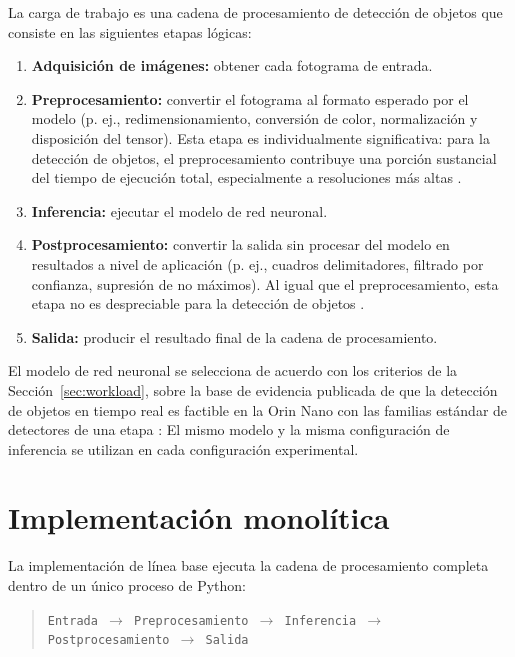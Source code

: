 La carga de trabajo es una cadena de procesamiento de detección de objetos
que consiste en las siguientes etapas lógicas:

\begin{enumerate}
  \item \textbf{Adquisición de imágenes:} obtener cada fotograma de
        entrada.
  \item \textbf{Preprocesamiento:} convertir el fotograma al formato
        esperado por el modelo (p. ej., redimensionamiento, conversión de
        color, normalización y disposición del tensor). Esta etapa es
        individualmente significativa: para la detección de objetos, el
        preprocesamiento contribuye una porción sustancial del tiempo de
        ejecución total, especialmente a resoluciones más altas
        \cite{szegedi2026}.
  \item \textbf{Inferencia:} ejecutar el modelo de red neuronal.
  \item \textbf{Postprocesamiento:} convertir la salida sin procesar del
        modelo en resultados a nivel de aplicación (p. ej., cuadros
        delimitadores, filtrado por confianza, supresión de no máximos). Al
        igual que el preprocesamiento, esta etapa no es despreciable para
        la detección de objetos \cite{szegedi2026}.
  \item \textbf{Salida:} producir el resultado final de la cadena de
        procesamiento.
\end{enumerate}

El modelo de red neuronal se selecciona de acuerdo con los criterios de la
Sección~\ref{sec:workload}, sobre la base de evidencia publicada de que la
detección de objetos en tiempo real es factible en la Orin Nano con las
familias estándar de detectores de una etapa \cite{scalcon2024,
alqahtani2026, szegedi2026,zequn2026}:
 El mismo modelo y la misma configuración de
inferencia se utilizan en cada configuración experimental.

\section{Implementación monolítica}
\label{sec:monolithic}

La implementación de línea base ejecuta la cadena de procesamiento completa
dentro de un único proceso de Python:

\begin{quote}
\texttt{Entrada $\rightarrow$ Preprocesamiento $\rightarrow$ Inferencia
$\rightarrow$ Postprocesamiento $\rightarrow$ Salida}
\end{quote}

